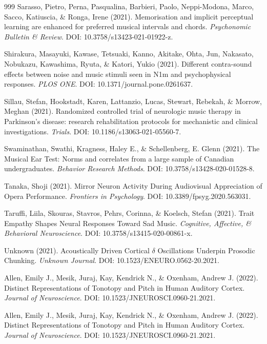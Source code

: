 \documentclass[9pt,onecolumn]{article}
\begin{document}
\begin{thebibliography}{999}
Sarasso, Pietro, Perna, Pasqualina, Barbieri, Paolo, Neppi-Modona, Marco, Sacco, Katiuscia, \& Ronga, Irene (2021). Memorisation and implicit perceptual learning are enhanced for preferred musical intervals and chords. \textit{Psychonomic Bulletin \& Review}. DOI: 10.3758/s13423-021-01922-z.

Shirakura, Masayuki, Kawase, Tetsuaki, Kanno, Akitake, Ohta, Jun, Nakasato, Nobukazu, Kawashima, Ryuta, \& Katori, Yukio (2021). Different contra-sound effects between noise and music stimuli seen in N1m and psychophysical responses. \textit{PLOS ONE}. DOI: 10.1371/journal.pone.0261637.

Sillau, Stefan, Hookstadt, Karen, Lattanzio, Lucas, Stewart, Rebekah, \& Morrow, Meghan (2021). Randomized controlled trial of neurologic music therapy in Parkinson's disease: research rehabilitation protocols for mechanistic and clinical investigations. \textit{Trials}. DOI: 10.1186/s13063-021-05560-7.

Swaminathan, Swathi, Kragness, Haley E., \& Schellenberg, E. Glenn (2021). The Musical Ear Test: Norms and correlates from a large sample of Canadian undergraduates. \textit{Behavior Research Methods}. DOI: 10.3758/s13428-020-01528-8.

Tanaka, Shoji (2021). Mirror Neuron Activity During Audiovisual Appreciation of Opera Performance. \textit{Frontiers in Psychology}. DOI: 10.3389/fpsyg.2020.563031.

Taruffi, Liila, Skouras, Stavros, Pehrs, Corinna, \& Koelsch, Stefan (2021). Trait Empathy Shapes Neural Responses Toward Sad Music. \textit{Cognitive, Affective, \& Behavioral Neuroscience}. DOI: 10.3758/s13415-020-00861-x.

Unknown (2021). Acoustically Driven Cortical $\delta$ Oscillations Underpin Prosodic Chunking. \textit{Unknown Journal}. DOI: 10.1523/ENEURO.0562-20.2021.

Allen, Emily J., Mesik, Juraj, Kay, Kendrick N., \& Oxenham, Andrew J. (2022). Distinct Representations of Tonotopy and Pitch in Human Auditory Cortex. \textit{Journal of Neuroscience}. DOI: 10.1523/JNEUROSCI.0960-21.2021.

Allen, Emily J., Mesik, Juraj, Kay, Kendrick N., \& Oxenham, Andrew J. (2022). Distinct Representations of Tonotopy and Pitch in Human Auditory Cortex. \textit{Journal of Neuroscience}. DOI: 10.1523/JNEUROSCI.0960-21.2021.


\end{thebibliography}
\end{document}
